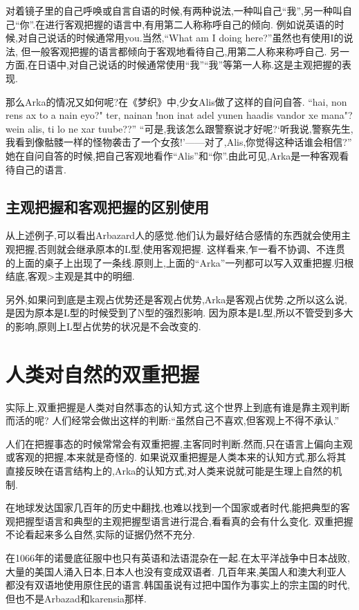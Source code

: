 对着镜子里的自己呼唤或自言自语的时候,有两种说法,一种叫自己``我'',另一种叫自己``你''.在进行客观把握的语言中,有用第二人称称呼自己的倾向.
例如说英语的时候,对自己说话的时候通常用you.当然,``What am I doing here?''虽然也有使用I的说法,
但一般客观把握的语言都倾向于客观地看待自己,用第二人称来称呼自己.
另一方面,在日语中,对自己说话的时候通常使用``我''``我''等第一人称.这是主观把握的表现.

那么Arka的情况又如何呢?在《梦织》中,少女Alis做了这样的自问自答.
``hai, non rens ax to a nain eyo?" ter, nainan !non inat adel yunen haadis vandor xe mana"?wein alis, ti lo ne xar tuube??''
``可是,我该怎么跟警察说才好呢?‘听我说,警察先生,我看到像骷髅一样的怪物袭击了一个女孩!’——对了,Alis,你觉得这种话谁会相信?''
她在自问自答的时候,把自己客观地看作``Alis''和``你''.由此可见,Arka是一种客观看待自己的语言.


\subsection{主观把握和客观把握的区别使用}
从上述例子,可以看出Arbazard人的感觉.他们认为最好结合感情的东西就会使用主观把握,否则就会继承原本的L型,使用客观把握.
这样看来,乍一看不协调、不连贯的上面的桌子上出现了一条线.原则上,上面的``Arka''一列都可以写入双重把握.归根结底,客观>主观是其中的明细.

另外,如果问到底是主观占优势还是客观占优势,Arka是客观占优势.之所以这么说,是因为原本是L型的时候受到了N型的强烈影响.
因为原本是L型,所以不管受到多大的影响,原则上L型占优势的状况是不会改变的.


\section{人类对自然的双重把握}
实际上,双重把握是人类对自然事态的认知方式.这个世界上到底有谁是靠主观判断而活的呢?
人们经常会做出这样的判断:``虽然自己不喜欢,但客观上不得不承认.''

人们在把握事态的时候常常会有双重把握,主客同时判断.然而,只在语言上偏向主观或客观的把握,本来就是奇怪的.
如果说双重把握是人类本来的认知方式,那么将其直接反映在语言结构上的,Arka的认知方式,对人类来说就可能是生理上自然的机制.

在地球发达国家几百年的历史中翻找,也难以找到一个国家或者时代,能把典型的客观把握型语言和典型的主观把握型语言进行混合,看看真的会有什么变化.
双重把握不论看起来多么自然,实际的证据仍然不充分.

在1066年的诺曼底征服中也只有英语和法语混杂在一起.在太平洋战争中日本战败,大量的美国人涌入日本,日本人也没有变成双语者.
几百年来,美国人和澳大利亚人都没有双语地使用原住民的语言.韩国虽说有过把中国作为事实上的宗主国的时代,但也不是Arbazad和karensia那样.


